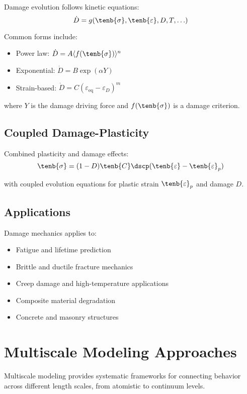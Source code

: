 Damage evolution follows kinetic equations:
\begin{equation}
\dot{D} = g(\tenb{\sigma}, \tenb{\varepsilon}, D, T, \ldots)
\end{equation}

Common forms include:
\begin{itemize}
\item Power law: $\dot{D} = A \langle f(\tenb{\sigma}) \rangle^n$
\item Exponential: $\dot{D} = B \exp(\alpha Y)$
\item Strain-based: $\dot{D} = C (\varepsilon_{\text{eq}} - \varepsilon_D)^m$
\end{itemize}

where $Y$ is the damage driving force and $f(\tenb{\sigma})$ is a damage criterion.

\subsection{Coupled Damage-Plasticity}

Combined plasticity and damage effects:
\begin{equation}
\tenb{\sigma} = (1-D) \tenb{C} \dscp (\tenb{\varepsilon} - \tenb{\varepsilon}_p)
\end{equation}

with coupled evolution equations for plastic strain $\tenb{\varepsilon}_p$ and damage $D$.

\subsection{Applications}

Damage mechanics applies to:
\begin{itemize}
\item Fatigue and lifetime prediction
\item Brittle and ductile fracture mechanics
\item Creep damage and high-temperature applications
\item Composite material degradation
\item Concrete and masonry structures
\end{itemize}

\section{Multiscale Modeling Approaches}

Multiscale modeling provides systematic frameworks for connecting behavior across different length scales, from atomistic to continuum levels.

